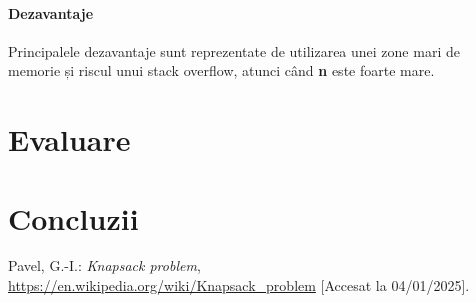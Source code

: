 \documentclass[runningheads]{llncs}
\begin{document}
\paragraph{Dezavantaje} Principalele dezavantaje sunt reprezentate de utilizarea unei zone mari de memorie
și riscul unui stack overflow, atunci când \textbf{n} este foarte mare.

\section{Evaluare}

\section{Concluzii}

%
%
%
% 
% 
%
\begin{thebibliography}{8}
Pavel, G.-I.: \emph{Knapsack problem}, \url{https://en.wikipedia.org/wiki/Knapsack_problem} [Accesat la 04/01/2025].

\end{thebibliography}
\end{document}
